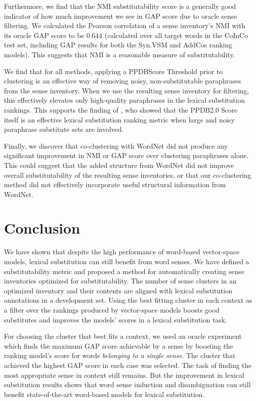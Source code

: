 \documentclass[11pt]{article}
\begin{document}
Furthermore, we find that the NMI substitutability score is a generally good indicator of how much improvement we see in GAP score due to oracle sense filtering. We calculated the Pearson correlation of a sense inventory's NMI with its oracle GAP score to be 0.644 (calculated over all target words in the CoInCo test set, including GAP results for both the Syn.VSM and AddCos ranking models). This suggests that NMI is a reasonable measure of substitutability. 

We find that for all methods, applying a PPDBScore Threshold prior to clustering is an effective way of removing noisy, non-substitutable paraphrases from the sense inventory. When we use the resulting sense inventory for filtering, this effectively elevates only high-quality paraphrases in the lexical substitution rankings. This supports the finding of , who showed that the PPDB2.0 Score itself is an effective lexical substitution ranking metric when large and noisy paraphrase substitute sets are involved.

Finally, we discover that co-clustering with WordNet did not produce any significant improvement in NMI or GAP score over clustering paraphrases alone. This could suggest that the added structure from WordNet did not improve overall substitutability of the resulting sense inventories, or that our co-clustering method did not effectively incorporate useful structural information from WordNet.


\section{Conclusion}

We have shown that despite the high performance of word-based vector-space models, lexical substitution can still benefit from word senses. We have defined a substitutability metric and proposed a method for automatically creating sense inventories optimized for substitutability. The number of sense clusters in an optimized inventory and their contents are aligned with lexical substitution annotations in a development set. Using the best fitting cluster in each context as a filter over the rankings produced by vector-space models boosts good substitutes and improves the models' scores in a lexical substitution task. 

For choosing the cluster that best fits a context, we used an oracle experiment which finds the maximum GAP score achievable by a sense by boosting the ranking model's score for words \textit{belonging to a single sense}. The cluster that achieved the highest GAP score in each case was selected. The task of finding the most appropriate sense in context still remains. But the improvement in lexical substitution results shows that word sense induction and disambiguation can still benefit state-of-the-art word-based models for lexical substitution. 
\end{document}
